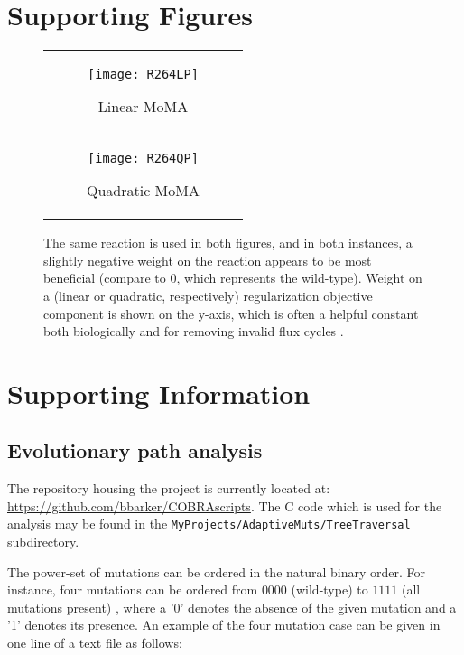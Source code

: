 \section{Supporting Figures}

\begin{figure}[H]
\centering
\begin{tabular}{c}
\begin{subfigure}[b]{\textwidth}
  \texttt{[image: R264LP]}
  \caption{Linear MoMA} 
  \label{fig:R264LP}
\end{subfigure}
\\
\begin{subfigure}[b]{\textwidth}
  \texttt{[image: R264QP]}
  \caption{Quadratic MoMA} 
  \label{fig:R264QP}
\end{subfigure}
\\
\end{tabular}
\caption{The same reaction is used in both figures, and in both
instances, a slightly negative weight on the reaction appears to be
most beneficial (compare to 0, which represents the wild-type).
Weight on a (linear or quadratic, respectively) 
regularization objective component is shown on the y-axis, which is often a helpful
constant both biologically and for removing invalid flux cycles 
\citep{Schuetz2012, Smallbone2009a}.}
\label{fig:wMoMA_smoothness}
\end{figure}

\section{Supporting Information}

\subsection{Evolutionary path analysis}
\label{sec:pathAnalysis}

The repository housing the project is currently located at:
\url{https://github.com/bbarker/COBRAscripts}. The C code which is
used for the analysis may be found in the
\texttt{MyProjects/AdaptiveMuts/TreeTraversal} subdirectory. 


%
%

The power-set of mutations can be ordered in the natural binary order.
For instance, four mutations can be ordered from $0000$ (wild-type) to
$1111$ (all mutations present) , where a '0' denotes the absence of
the given mutation and a '1' denotes its presence. An example of the
four mutation case can be given in one line of a text file as follows:

